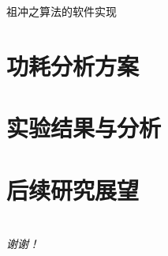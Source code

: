 \documentclass{beamer}
\begin{document}
\begin{frame}{祖冲之算法的软件实现}

\end{frame}

\section{功耗分析方案}




\section{实验结果与分析}




\section{后续研究展望} %




\section{}
\begin{frame}{}
\centering \huge
\emph{谢谢！}
\end{frame}
\end{document}
